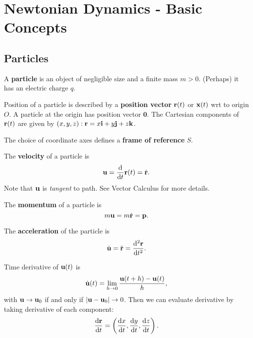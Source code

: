 \section{Newtonian Dynamics - Basic Concepts}
\subsection{Particles}
\begin{definition}[Particle]
    A \textbf{particle} is an object of negligible size and a finite mass $m>0$. (Perhaps) it has an electric charge $q$. 
\end{definition}
\begin{definition}
    Position of a particle is described by a \textbf{position vector} ${\bf r}(t)$ or ${\bf x}(t)$ wrt to origin $O$. A particle at the origin has position vector $ \mathbf{0} $. The Cartesian components of ${\bf r}(t)$ are given by $(x,y,z): 
    \mathbf{r}= x {\bf i} + y{\bf j} + z{\bf k}$. 
\end{definition}
\begin{definition}
    The choice of coordinate axes defines a \textbf{frame of reference} $S$.
\end{definition}
\begin{definition}[Velocity]
    The \textbf{velocity} of a particle is 
    \[
        {\bf u} = \frac{\mathrm{d}}{\mathrm{d}t} {\bf r}(t) = \dot{{\bf r}}. 
    \]
    Note that $ {\bf u} $ is \textit{tangent} to path. See Vector Calculus for more details.
\end{definition}
\begin{definition}[Momentum]
    The \textbf{momentum} of a particle is 
    \[
        m{\bf u} = m \dot{{\bf r}} = {\bf p}.
    \]
\end{definition}
\begin{definition}[Acceleration]
    The \textbf{acceleration} of the particle is 
    \[
        \dot{{\bf u}}= \ddot{{\bf r}} = \frac{\mathrm{d}^2{\bf r}}{\mathrm{d}t^2}.
    \]
\end{definition}
\begin{note}
    Time derivative of ${\bf u}(t)$ is
    \[
        \dot{{\bf u}}(t) = \lim_{h \to 0} \frac{{\bf u}(t+h)-{\bf u}(t)}{h},
    \]
    with ${\bf u}\to{\bf u}_0$ if and only if $|{\bf u}-{\bf u}_0|\to 0$. Then we can evaluate derivative by taking derivative of each component:
    \[
        \frac{\mathrm{d}{\bf r}}{\mathrm{d}t} = \left( \frac{\mathrm{d}x}{\mathrm{d}t}, \frac{\mathrm{d}y}{\mathrm{d}t}, \frac{\mathrm{d}z}{\mathrm{d}t} \right). 
    \]
\end{note}
